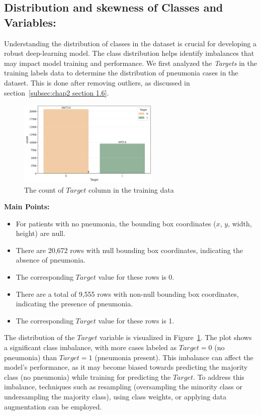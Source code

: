 \subsection{Distribution and skewness of Classes and Variables:}
\label{subsec:chap2 section 1.2}

Understanding the distribution of classes in the dataset is crucial for developing a robust deep-learning model. The class distribution helps identify imbalances that may impact model training and performance. We first analyzed the \emph{Targets} in the training labels data to determine the distribution of pneumonia cases in the dataset. This is done after removing outliers, as discussed in section~\ref{subsec:chap2 section 1.6}.

\begin{figure}[H]
    \begin{center}
        \includegraphics[width = 0.6\textwidth]{figures/Figure1.png}
        \caption{The count of $Target$ column in the training data}
        \label{fig:cha-2 figure1}
    \end{center}
\end{figure}

\textbf{Main Points:}

\begin{itemize}
    \item For patients with no pneumonia, the bounding box coordinates ($x$, $y$, width, height) are null.
    \item There are 20,672 rows with null bounding box coordinates, indicating the absence of pneumonia.
    \item The corresponding $Target$ value for these rows is 0.
    \item There are a total of 9,555 rows with non-null bounding box coordinates, indicating the presence of pneumonia.
    \item The corresponding $Target$ value for these rows is 1.
\end{itemize}

The distribution of the $Target$ variable is visualized in Figure~\ref{fig:cha-2 figure1}. The plot shows a significant class imbalance, with more cases labeled as $Target = 0$ (no pneumonia) than $Target = 1$ (pneumonia present). This imbalance can affect the model's performance, as it may become biased towards predicting the majority class (no pneumonia) while training for predicting the $Target$.
To address this imbalance, techniques such as resampling (oversampling the minority class or undersampling the majority class), using class weights, or applying data augmentation can be employed.

